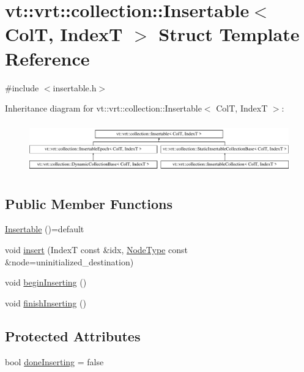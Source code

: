\hypertarget{structvt_1_1vrt_1_1collection_1_1_insertable}{}\section{vt\+:\+:vrt\+:\+:collection\+:\+:Insertable$<$ ColT, IndexT $>$ Struct Template Reference}
\label{structvt_1_1vrt_1_1collection_1_1_insertable}


{\ttfamily \#include $<$insertable.\+h$>$}

Inheritance diagram for vt\+:\+:vrt\+:\+:collection\+:\+:Insertable$<$ ColT, IndexT $>$\+:\begin{figure}[H]
\begin{center}
\leavevmode
\includegraphics[height=2.193212cm]{structvt_1_1vrt_1_1collection_1_1_insertable}
\end{center}
\end{figure}
\subsection*{Public Member Functions}
\begin{DoxyCompactItemize}
\item 
\hyperlink{structvt_1_1vrt_1_1collection_1_1_insertable_afc3dfcc785bd431f0b4d8d678cbff29f}{Insertable} ()=default
\item 
void \hyperlink{structvt_1_1vrt_1_1collection_1_1_insertable_aa5b6bd8662d45359d8cbda1826c79b5e}{insert} (IndexT const \&idx, \hyperlink{namespacevt_a866da9d0efc19c0a1ce79e9e492f47e2}{Node\+Type} const \&node=uninitialized\+\_\+destination)
\item 
void \hyperlink{structvt_1_1vrt_1_1collection_1_1_insertable_abe80dfadbd83ac7cd64922fdf1a38a9c}{begin\+Inserting} ()
\item 
void \hyperlink{structvt_1_1vrt_1_1collection_1_1_insertable_af4d5f1e9bc119de61354ab7936b445d1}{finish\+Inserting} ()
\end{DoxyCompactItemize}
\subsection*{Protected Attributes}
\begin{DoxyCompactItemize}
\item 
bool \hyperlink{structvt_1_1vrt_1_1collection_1_1_insertable_a265055b249a884d0108e2a6ec3b4dacb}{done\+Inserting} = false
\end{DoxyCompactItemize}


